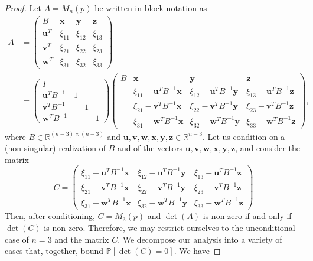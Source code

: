 \documentclass[reqno]{amsart}
\numberwithin{equation}{section}
\begin{document}
\begin{proof}
Let $A = M_n(p)$ be written in block notation as
\begin{align*}
A &=  \begin{pmatrix} B & \bm{x} & \bm{y} & \bm{z} \\ \bm{u}^T & \xi_{11} & \xi_{12} & \xi_{13} \\ \bm{v}^T & \xi_{21} & \xi_{22} & \xi_{23} \\ \bm{w}^T & \xi_{31} & \xi_{32} & \xi_{33} \end{pmatrix} \\
&= \begin{pmatrix} I &  &  &  \\ \bm{u}^T B^{-1} & 1 &  & \\ \bm{v}^T B^{-1} &  & 1 & \\ \bm{w}^T B^{-1} &  & & 1\end{pmatrix} \begin{pmatrix} B & \bm{x} & \bm{y} & \bm{z} \\  & \xi_{11} - \bm{u}^T B^{-1} \bm{x} & \xi_{12} - \bm{u}^T B^{-1} \bm{y} & \xi_{13}- \bm{u}^T B^{-1} \bm{z} \\ & \xi_{21} - \bm{v}^T B^{-1} \bm{x}& \xi_{22} - \bm{v}^T B^{-1} \bm{y}& \xi_{23} - \bm{v}^T B^{-1} \bm{z} \\ & \xi_{31} - \bm{w}^T B^{-1} \bm{x}& \xi_{32} - \bm{w}^T B^{-1} \bm{y}& \xi_{33} - \bm{w}^T B^{-1} \bm{z} \end{pmatrix},
\end{align*}
where $B \in \mathbb{R}^{(n-3)\times(n-3)}$ and $\bm{u},\bm{v},\bm{w},\bm{x},\bm{y},\bm{z} \in \mathbb{R}^{n-3}$. Let us condition on a (non-singular) realization of $B$ and of the vectors $\bm{u},\bm{v},\bm{w},\bm{x},\bm{y},\bm{z}$, and consider the matrix
\[C = \begin{pmatrix}  \xi_{11} - \bm{u}^T B^{-1} \bm{x} & \xi_{12} - \bm{u}^T B^{-1} \bm{y} & \xi_{13}- \bm{u}^T B^{-1} \bm{z} \\  \xi_{21} - \bm{v}^T B^{-1} \bm{x}& \xi_{22} - \bm{v}^T B^{-1} \bm{y}& \xi_{23} - \bm{v}^T B^{-1} \bm{z} \\  \xi_{31} - \bm{w}^T B^{-1} \bm{x}& \xi_{32} - \bm{w}^T B^{-1} \bm{y}& \xi_{33} - \bm{w}^T B^{-1} \bm{z} \end{pmatrix}\]
Then, after conditioning, $C = M_3(p)$ and $\det(A)$ is non-zero if and only if $\det(C)$ is non-zero. Therefore, we may restrict ourselves to the unconditional case of $n = 3$ and the matrix $C$. We decompose our analysis into a variety of cases that, together, bound $\mathbb{P}[\det(C) = 0]$. We have

\end{proof}
\end{document}
